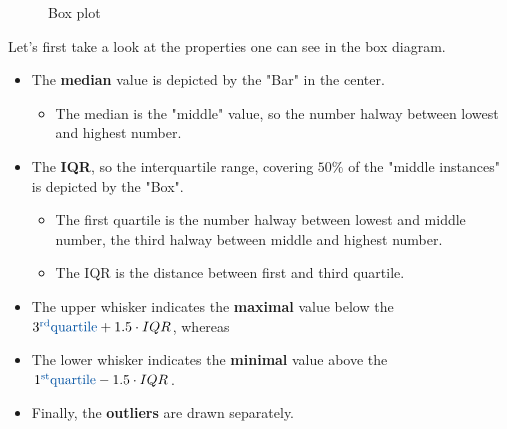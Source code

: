 \begin{figure}[h]
  \centering
  \hspace*{0.05\textwidth}
  \caption{Box plot}
  \label{fig:2_box_plot}
\end{figure}

Let's first take a look at the properties one can see in the box diagram. 
\begin{itemize}
  \item The \textbf{median} value is depicted by the "Bar" in the center.
  \begin{itemize}
    \item The median is the "middle" value, so the number halway between lowest and highest number.
  \end{itemize}
  \item The \textbf{IQR}, so the interquartile range, covering $50\%$ of the "middle instances" is depicted by the "Box".
  \begin{itemize}
    \item The first quartile is the number halway between lowest and middle number, the third halway between middle and highest number.
    \item The IQR is the distance between first and third quartile.
  \end{itemize}
  \item The upper whisker indicates the \textbf{maximal} value below the $3^{\text{\color{mathblue}rd}} \text{\color{mathblue} quartile} + 1.5\cdot IQR$, whereas
  \item The lower whisker indicates the \textbf{minimal} value above the $1^{\text{\color{mathblue}st}} \text{\color{mathblue} quartile} - 1.5\cdot IQR$.
  \item Finally, the \textbf{outliers} are drawn separately.
\end{itemize}

